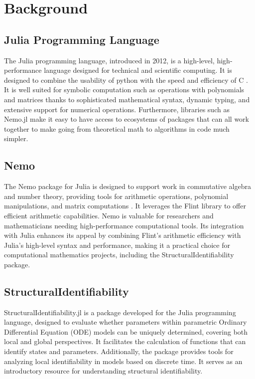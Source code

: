 \documentclass[oneside, a4paper, onecolumn, 11pt]{article}
\begin{document}
\newpage
\tableofcontents
\newpage


\section{Background}

\subsection{Julia Programming Language}

The Julia programming language, introduced in 2012, is a high-level, high-performance language designed for technical and scientific computing. It is designed to combine the usability of python with the speed and efficiency of C \cite{bezanson2017julia}. It is well suited for symbolic computation such as operations with polynomials and matrices thanks to sophisticated mathematical syntax, dynamic typing, and extensive support for numerical operations. Furthermore, libraries such as Nemo.jl make it easy to have access to ecosystems of packages that can all work together to make going from theoretical math to algorithms in code much simpler.

\subsection{Nemo}

The Nemo package for Julia is designed to support work in commutative algebra and number theory, providing tools for arithmetic operations, polynomial manipulations, and matrix computations \cite{nemo}. It leverages the Flint library to offer efficient arithmetic capabilities. Nemo is valuable for researchers and mathematicians needing high-performance computational tools. Its integration with Julia enhances its appeal by combining Flint's arithmetic efficiency with Julia's high-level syntax and performance, making it a practical choice for computational mathematics projects, including the StructuralIdentifiability package.

\subsection{StructuralIdentifiability}

StructuralIdentifiability.jl is a package developed for the Julia programming language, designed to evaluate whether parameters within parametric Ordinary Differential Equation (ODE) models can be uniquely determined, covering both local and global perspectives. It facilitates the calculation of functions that can identify states and parameters. Additionally, the package provides tools for analyzing local identifiability in models based on discrete time. It serves as an introductory resource for understanding structural identifiability.
\end{document}
